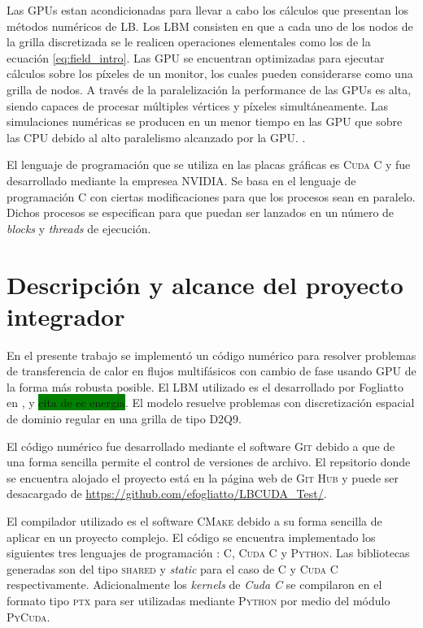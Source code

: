Las GPUs estan acondicionadas para llevar a cabo los cálculos que presentan los métodos numéricos de LB. Los LBM consisten en que a cada uno de los nodos de la grilla discretizada se le realicen operaciones elementales como los de la ecuación \ref{eq:field_intro}. Las GPU se encuentran optimizadas para ejecutar cálculos sobre los píxeles de un monitor, los cuales pueden considerarse como una grilla de nodos. A través de la paralelización la performance de las GPUs es alta, siendo capaces de procesar múltiples vértices y píxeles simultáneamente. Las simulaciones numéricas se producen en un menor tiempo en las GPU que sobre las CPU debido al alto paralelismo alcanzado por la GPU. \cite{rinaldi2011modelos}.


El lenguaje de programación que se utiliza en las placas gráficas es \textsc{Cuda C} y fue desarrollado mediante la empresea NVIDIA. Se basa en el lenguaje de programación \textsc{C} con ciertas modificaciones para que los procesos sean en paralelo. Dichos procesos se especifican para que puedan ser lanzados en un número de \textit{blocks} y \textit{threads} de ejecución.

\newpage

\section{Descripción y alcance del proyecto integrador}

En el presente trabajo se implementó un código numérico para resolver problemas de transferencia de calor en flujos multifásicos con cambio de fase usando GPU de la forma más robusta posible. El LBM utilizado es el desarrollado por Fogliatto en \cite{fogliatto2018modelado}, \cite{fogliatto2019simulation} y \colorbox{green}{cita de ec energia}. El modelo resuelve problemas con discretización espacial de dominio regular en una grilla de tipo D2Q9.

El código numérico fue desarrollado mediante el software \textsc{Git} debido a que de una forma sencilla permite el control de versiones de archivo.  El repsitorio donde se encuentra alojado el proyecto está en la página web de \textsc{Git Hub} y puede ser desacargado de \url{https://github.com/efogliatto/LBCUDA_Test/}. 

El compilador utilizado es el software \textsc{CMake} debido a su forma sencilla de aplicar en un proyecto complejo. El código se encuentra implementado los siguientes tres lenguajes de programación : \textsc{C}, \textsc{Cuda C} y \textsc{Python}. Las bibliotecas generadas son del tipo \textsc{shared} y \textit{static} para el caso de \textsc{C} y \textsc{Cuda C} respectivamente. Adicionalmente los \textit{kernels} de \textit{Cuda C} se compilaron en el formato tipo \textsc{ptx} para ser utilizadas mediante \textsc{Python} por medio del módulo \textsc{PyCuda}.

